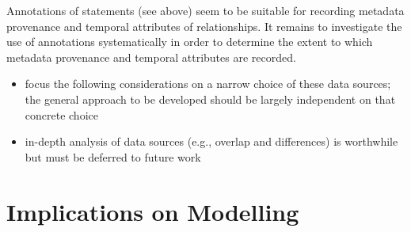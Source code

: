 Annotations of statements (see above) seem to be suitable for 
recording metadata provenance and temporal attributes of relationships.
It remains to investigate the use of annotations systematically
in order to determine the extent to which metadata provenance and temporal attributes
are recorded.

%


\begin{itemize}
  \item
    focus the following considerations on a narrow choice of these data sources;
    the general approach to be developed should be largely independent on that concrete choice
  \item 
    in-depth analysis of data sources (e.g., overlap and differences) is worthwhile
    but must be deferred to future work
\end{itemize}

%

\section{Implications on Modelling}
\label{sec:implications_on_modelling}

